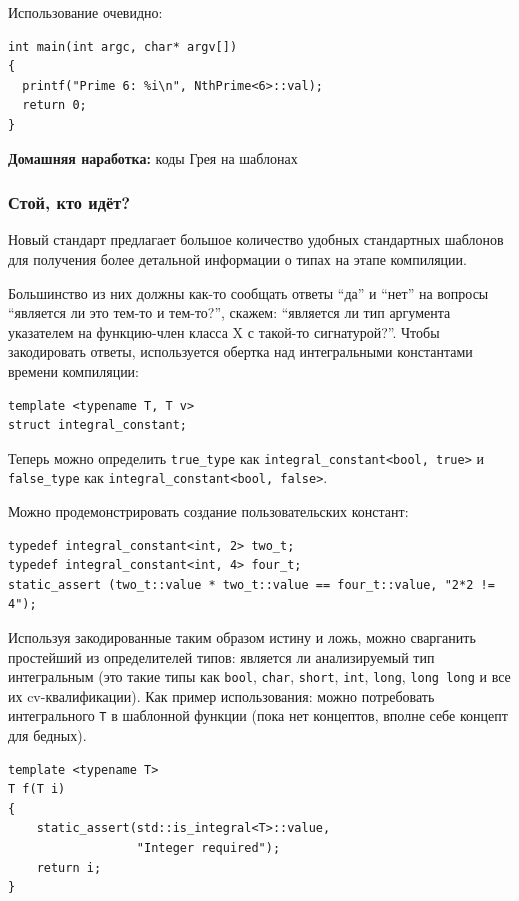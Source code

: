 \documentclass[a4paper,12pt,oneside]{article}
\begin{document}
Использование очевидно:

\begin{lstlisting}
int main(int argc, char* argv[])
{
  printf("Prime 6: %i\n", NthPrime<6>::val);
  return 0;
}
\end{lstlisting}

\textbf{Домашняя наработка:} коды Грея на шаблонах

\subsubsection{Стой, кто идёт?}\label{TypeTraits}

Новый стандарт предлагает большое количество удобных стандартных шаблонов для получения более детальной информации о типах на этапе компиляции. 

Большинство из них должны как-то сообщать ответы ``да'' и ``нет'' на вопросы ``является ли это тем-то и тем-то?'', скажем: ``является ли тип аргумента указателем на функцию-член класса X с такой-то сигнатурой?''. Чтобы закодировать ответы, используется обертка над интегральными константами времени компиляции:

\begin{lstlisting}
template <typename T, T v>
struct integral_constant;
\end{lstlisting}

Теперь можно определить \lstinline!true_type! как \lstinline!integral_constant<bool, true>! и \lstinline!false_type! как \lstinline!integral_constant<bool, false>!.

Можно продемонстрировать создание пользовательских констант:

\begin{lstlisting}
typedef integral_constant<int, 2> two_t;
typedef integral_constant<int, 4> four_t;
static_assert (two_t::value * two_t::value == four_t::value, "2*2 != 4");
\end{lstlisting}

Используя закодированные таким образом истину и ложь, можно сварганить простейший из определителей типов: является ли анализируемый тип интегральным (это такие типы как \lstinline!bool!, \lstinline!char!, \lstinline!short!, \lstinline!int!, \lstinline!long!, \lstinline!long long! и все их cv-квалификации). Как пример использования: можно потребовать интегрального \lstinline!T! в шаблонной функции (пока нет концептов, вполне себе концепт для бедных).

\begin{lstlisting}
template <typename T>
T f(T i)
{
    static_assert(std::is_integral<T>::value, 
                  "Integer required");
    return i;
}
\end{lstlisting}
\end{document}
